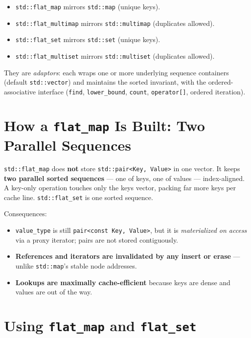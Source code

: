 \begin{itemize}
    \item \lstinline|std::flat_map| mirrors \lstinline|std::map| (unique keys).
    \item \lstinline|std::flat_multimap| mirrors \lstinline|std::multimap| (duplicates allowed).
    \item \lstinline|std::flat_set| mirrors \lstinline|std::set| (unique keys).
    \item \lstinline|std::flat_multiset| mirrors \lstinline|std::multiset| (duplicates allowed).
\end{itemize}

They are \emph{adaptors}: each wraps one or more underlying sequence containers (default \lstinline|std::vector|) and maintains the sorted invariant, with the ordered-associative interface (\lstinline|find|, \lstinline|lower_bound|, \lstinline|count|, \lstinline|operator[]|, ordered iteration).

\section{How a \texttt{flat\_map} Is Built: Two Parallel Sequences}

\lstinline|std::flat_map| does \textbf{not} store \lstinline|std::pair<Key, Value>| in one vector. It keeps \textbf{two parallel sorted sequences} --- one of keys, one of values --- index-aligned. A key-only operation touches only the keys vector, packing far more keys per cache line. \lstinline|std::flat_set| is one sorted sequence.

Consequences:

\begin{itemize}
    \item \lstinline|value_type| is still \lstinline|pair<const Key, Value>|, but it is \emph{materialized on access} via a proxy iterator; pairs are not stored contiguously.
    \item \textbf{References and iterators are invalidated by any insert or erase} --- unlike \lstinline|std::map|'s stable node addresses.
    \item \textbf{Lookups are maximally cache-efficient} because keys are dense and values are out of the way.
\end{itemize}

\section{Using \texttt{flat\_map} and \texttt{flat\_set}}

